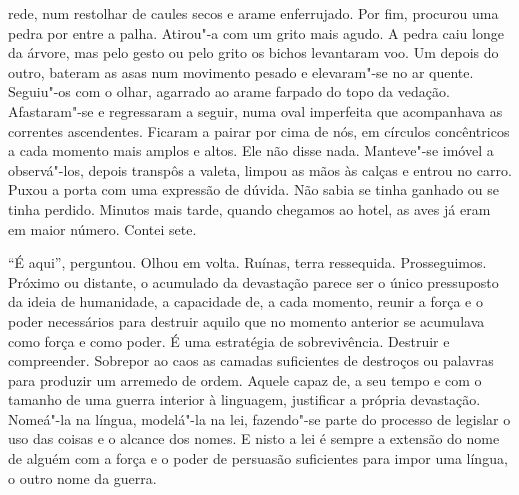 rede, num restolhar de caules secos e arame enferrujado. Por fim,
procurou uma pedra por entre a palha. Atirou"-a com um grito mais agudo.
A pedra caiu longe da árvore, mas pelo gesto ou pelo grito os bichos
levantaram voo. Um depois do outro, bateram as asas num movimento pesado
e elevaram"-se no ar quente. Seguiu"-os com o olhar, agarrado ao arame
farpado do topo da vedação. Afastaram"-se e regressaram a seguir, numa
oval imperfeita que acompanhava as correntes ascendentes. Ficaram a
pairar por cima de nós, em círculos concêntricos a cada momento mais
amplos e altos. Ele não disse nada. Manteve"-se imóvel a observá"-los,
depois transpôs a valeta, limpou as mãos às calças e entrou no carro.
Puxou a porta com uma expressão de dúvida. Não sabia se tinha ganhado ou
se tinha perdido. Minutos mais tarde, quando chegamos ao hotel, as aves
já eram em maior número. Contei sete.

``É aqui'',
perguntou. Olhou em volta. Ruínas, terra ressequida. Prosseguimos.
Próximo ou distante, o acumulado da devastação parece ser o único
pressuposto da ideia de humanidade, a capacidade de, a cada momento,
reunir a força e o poder necessários para destruir aquilo que no momento
anterior se acumulava como força e como poder. É uma estratégia de
sobrevivência. Destruir e compreender. Sobrepor ao caos as camadas
suficientes de destroços ou palavras para produzir um arremedo de ordem.
Aquele capaz de, a seu tempo e com o tamanho de uma guerra interior à
linguagem, justificar a própria devastação. Nomeá"-la na língua,
modelá"-la na lei, fazendo"-se parte do processo de legislar o uso das
coisas e o alcance dos nomes. E nisto a lei é sempre a extensão do nome
de alguém com a força e o poder de persuasão suficientes para impor uma
língua, o outro nome da guerra.

